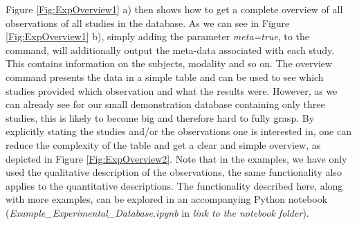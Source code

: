 \documentclass[a4paper,10pt]{article}
\begin{document}
Figure \ref{Fig:ExpOverview1} a) then shows how to get a complete overview of all observations of all studies in the database. As we can see in Figure \ref{Fig:ExpOverview1} b), simply adding the parameter \textit{meta=true},
to the command, will additionally output the meta-data associated with each study. This contains information on the subjects, modality and so on.
The overview command presents the data in a simple table and can be used to see which studies provided 
which observation and what the results were. However, as we can already see for our small demonstration database containing only three studies, this is likely to become big and therefore hard to fully grasp.
By explicitly stating the studies and/or the observations one is interested in, one can reduce the complexity of the table and get a clear and simple overview, as depicted in Figure \ref{Fig:ExpOverview2}. Note that in the
examples, we have only used the qualitative description of the observations, the same functionality also applies to the quantitative descriptions. The functionality described here, along with
more examples, can be explored in an accompanying Python notebook (\textit{Example\_Experimental\_Database.ipynb} in \textit{link to the notebook folder}).
\end{document}
